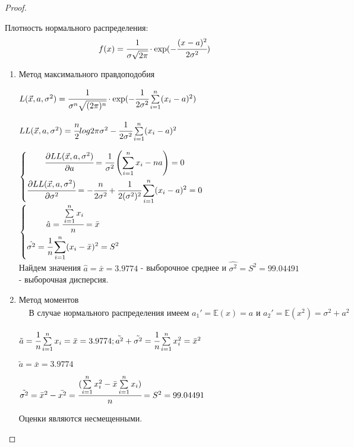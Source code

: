 \begin{proof}
	$ $
	
	Плотность нормального распределения:
	\begin{equation}
		f(x)=\cfrac{1}{\sigma\sqrt{2\pi}} \cdot \exp({-\cfrac{(x-a)^2}{2\sigma^2}})
	\end{equation}

	\begin{enumerate}
		\item Метод максимального правдоподобия

			$L(\vec{x}, a, \sigma^2)=\cfrac{1}{\sigma^n\sqrt{(2\pi)^n}} \cdot \exp({-\cfrac1{2\sigma^2}}\sum\limits_{i=1}^n(x_i-a)^2)$

			$LL(\vec{x}, a, \sigma^2)=\cfrac{n}{2}log2\pi\sigma^2-\cfrac{1}{2\sigma^2}\sum\limits_{i=1}^n(x_i-a)^2$ 	

		$\left\lbrace
		\begin{gathered}
			\cfrac{\partial LL(\vec{x}, a, \sigma^2)}{\partial a}=\cfrac{1}{\sigma^2}\left(\sum\limits_{i=1}^nx_i-na\right)=0 \\
			\cfrac{\partial LL(\vec{x}, a, \sigma^2)}{\partial \sigma^2}=-\cfrac{n}{2\sigma^2}+\cfrac{1}{2(\sigma^2)^2}\sum\limits_{i=1}^n(x_i-a)^2=0 
		\end{gathered}	
		\right.$ \\
		
		$\left\lbrace	
		\begin{gathered}	
			\hat{a}=\cfrac{\sum\limits_{i=1}^nx_i}{n}=\bar{x} \\
			\hat{\sigma^2}=\cfrac1n\sum\limits_{i=1}^n(x_i-\bar{x})^2=S^2 
		\end{gathered}
		\right.$ \\
		
		Найдем значения $\hat{a}=\bar{x}=3.9774$ - выборочное среднее и $\hat{\sigma^2}=S^2=99.04491$ - выборочная дисперсия. \\
		\item Метод моментов
		\begin{align}
			& \text{В случае нормального распределения имеем }a_1'=\mathbb{E}(x)=a \text{ и } a_2'=\mathbb{E}(x^2)=\sigma^2+a^2 
		\end{align}	


			$\tilde{a}=\cfrac{1}{n}\sum\limits_{i=1}^nx_i=\bar{x}=3.9774; \tilde{a^2}+\tilde{\sigma^2}=\cfrac1n\sum\limits_{i=1}^nx_i^2=\bar{x}^2$ 

			$\tilde{a}=\bar{x}=3.9774$
			
			$\tilde{\sigma^2}=\bar{x}^2-\bar{x^2}=\cfrac{(\sum\limits_{i=1}^nx_i^2-\bar{x}\sum\limits_{i=1}^nx_i)}{n}=S^2=99.04491$
			
            Оценки являются несмещенными.
	\end{enumerate}
\end{proof}



